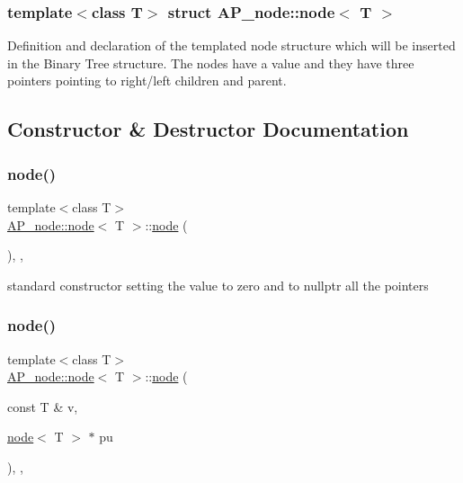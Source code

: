\subsubsection*{template$<$class T$>$\newline
struct A\+P\+\_\+node\+::node$<$ T $>$}

Definition and declaration of the templated node structure which will be inserted in the Binary Tree structure. The nodes have a value and they have three pointers pointing to right/left children and parent. 

\subsection{Constructor \& Destructor Documentation}
\mbox{\label{structAP__node_1_1node_aacecb07aeda049c5b310c6178fd024dc}} 
\subsubsection{\texorpdfstring{node()}{node()}\hspace{0.1cm}{\footnotesize\ttfamily [1/3]}}
{\footnotesize\ttfamily template$<$class T$>$ \\
\hyperlink{structAP__node_1_1node}{A\+P\+\_\+node\+::node}$<$ T $>$\+::\hyperlink{structAP__node_1_1node}{node} (\begin{DoxyParamCaption}{ }\end{DoxyParamCaption})\hspace{0.3cm}{\ttfamily [inline]}, {\ttfamily [explicit]}, {\ttfamily [noexcept]}}

standard constructor setting the value to zero and to nullptr all the pointers \mbox{\label{structAP__node_1_1node_a364c333ccf25b7f1c4ac766a23e86ee6}} 
\subsubsection{\texorpdfstring{node()}{node()}\hspace{0.1cm}{\footnotesize\ttfamily [2/3]}}
{\footnotesize\ttfamily template$<$class T$>$ \\
\hyperlink{structAP__node_1_1node}{A\+P\+\_\+node\+::node}$<$ T $>$\+::\hyperlink{structAP__node_1_1node}{node} (\begin{DoxyParamCaption}\item[{const T \&}]{v,  }\item[{\hyperlink{structAP__node_1_1node}{node}$<$ T $>$ $\ast$}]{pu }\end{DoxyParamCaption})\hspace{0.3cm}{\ttfamily [inline]}, {\ttfamily [explicit]}, {\ttfamily [noexcept]}}

